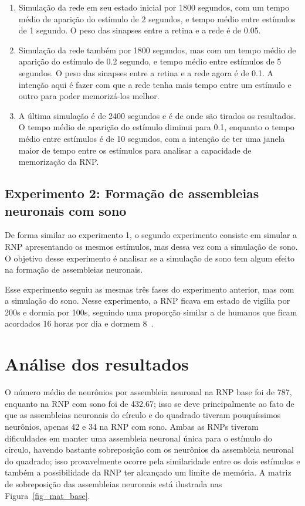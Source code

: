 \begin{enumerate}
  \item Simulação da rede em seu estado inicial por 1800 segundos, com um tempo médio de aparição do estímulo de 2 segundos, e
  tempo médio entre estímulos de 1 segundo. O peso das sinapses entre a retina e a rede é de 0.05.
  \item Simulação da rede também por 1800 segundos, mas com um tempo médio de aparição do estímulo de 0.2 segundo, e
  tempo médio entre estímulos de 5 segundos. O peso das sinapses entre a retina e a rede agora é de 0.1. A intenção aqui é
  fazer com que a rede tenha mais tempo entre um estímulo e outro para poder memorizá-los melhor.
  \item A última simulação é de 2400 segundos e é de onde são tirados os resultados. O tempo médio de aparição do estímulo diminui
  para 0.1, enquanto o tempo médio entre estímulos é de 10 segundos, com a intenção de ter uma janela maior de tempo entre os
  estímulos para analisar a capacidade de memorização da RNP.
\end{enumerate}


\subsection{Experimento 2: Formação de assembleias neuronais com sono}

De forma similar ao experimento 1, o segundo experimento consiste em simular a RNP apresentando os mesmos estímulos, mas dessa vez
com a simulação de sono. O objetivo desse experimento é analisar se a simulação de sono tem algum efeito na formação de
assembleias neuronais.

Esse experimento seguiu as mesmas três fases do experimento anterior, mas com a simulação do sono. Nesse experimento, a RNP ficava
em estado de vigília por 200s e dormia por 100s, seguindo uma proporção similar a de humanos que ficam acordados 16 horas por dia
e dormem 8~\cite{waterhouseDaily2012}.

\section{Análise dos resultados}

O número médio de neurônios por assembleia neuronal na RNP base foi de 787, enquanto na RNP com sono foi de 432.67; isso se deve
principalmente ao fato de que as assembleias neuronais do círculo e do quadrado tiveram pouquíssimos neurônios, apenas 42 e 34 na
RNP com sono. Ambas as RNPs tiveram dificuldades em manter uma assembleia neuronal única para o estímulo do círculo, havendo
bastante sobreposição com os neurônios da assembleia neuronal do quadrado; isso provavelmente ocorre pela similaridade entre os
dois estímulos e também a possibilidade da RNP ter alcançado um limite de memória. A matriz de sobreposição das assembleias
neuronais está ilustrada nas Figura~\ref{fig_mat_base}.

